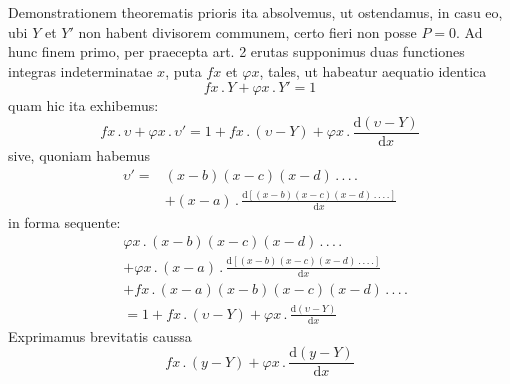 Demonstrationem theorematis prioris ita absolvemus, ut ostendamus, in
casu eo, ubi $Y$ et $Y'$ non habent divisorem communem, certo fieri non posse
$P=0$. Ad hunc finem primo, per praecepta art. 2 erutas supponimus duas
functiones integras indeterminatae $x$, puta $fx$ et $\varphi x$, tales, ut habeatur aequatio identica
\[
fx\, .\,Y+\varphi x\, .\,Y'=1
\]
quam hic ita exhibemus:
\[
fx\, .\,\upsilon+\varphi x\, .\,\upsilon'=1+fx\, .\,(\upsilon-Y)+\varphi x\, .\,\frac{\mathrm d(\upsilon-Y)}{\mathrm dx}
\]
sive, quoniam habemus
\[
\begin{aligned}
\upsilon'={}&(x-b)(x-c)(x-d)\, .\, .\, .\, .\\
&+(x-a)\, .\,\frac{\mathrm d[(x-b)(x-c)(x-d)\, .\, .\, .\, .]}{\mathrm dx}
\end{aligned}
\]
in forma sequente:
\[
\begin{aligned}
&\varphi x\, .\,(x-b)(x-c)(x-d)\, .\, .\, .\, .\\
&+\varphi x\, .\,(x-a)\, .\,\frac{\mathrm d[(x-b)(x-c)(x-d)\, .\, .\, .\, .]}{\mathrm dx}\\
&+fx\, .\,(x-a)(x-b)(x-c)(x-d)\, .\, .\, .\, .\\&=1+fx\, .\,(\upsilon-Y)+\varphi x\, .\,\frac{\mathrm d(\upsilon-Y)}{\mathrm dx}
\end{aligned}
\]
Exprimamus brevitatis caussa
\[
fx\, .\,(y-Y)+\varphi x\, .\,\frac{\mathrm d(y-Y)}{\mathrm dx}
\]

